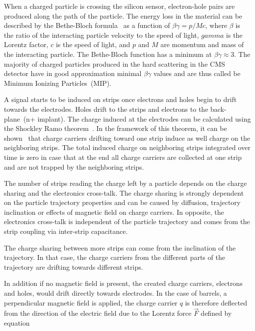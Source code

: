 When a charged particle is crossing the silicon sensor, electron-hole pairs are produced along the path of the particle. The energy loss in the material can be described by the Bethe-Bloch formula~\cite{Groom:2000sm} as a function of $\beta\gamma = p/Mc$, where $\beta$ is the ratio of the interacting particle velocity to the speed of light, $gamma$ is the Lorentz factor, $c$ is the speed of light, and $p$ and $M$ are momentum and mass of the interacting particle. The Bethe-Bloch function has a minimum at $\beta\gamma \approx 3$. The majority of charged particles produced in the hard scattering in the CMS detector have in good approximation minimal $\beta\gamma$ values and are thus called be Minimum Ionizing Particles~(MIP).

A signal starts to be induced on strips once electrons and holes begin to drift towards the electrodes. Holes drift to the strips and electrons to the back-plane~(n+ implant). The charge induced at the electrodes can be calculated using the Shockley Ramo theorem~\cite{doi:10.1063/1.1710367,Ramo:1939vr}. In the framework of this theorem, it can be shown~\cite{Bloch:2007zza} that charge carriers drifting toward one strip induce as well charge on the neighboring strips. The total induced charge on neighboring strips integrated over time is zero in case that at the end all charge carriers are collected at one strip and are not trapped by the neighboring strips.

The number of strips reading the charge left by a particle depends on the charge sharing and the electronics cross-talk. The charge sharing is strongly dependent on the particle trajectory properties and can be caused by diffusion, trajectory inclination or effects of magnetic field on charge carriers. In opposite, the electronics cross-talk is independent of the particle trajectory and comes from the strip coupling via inter-strip capacitance.  

The charge sharing between more strips can come from the inclination of the trajectory. In that case, the charge carriers from the different parts of the trajectory are drifting towards different strips.

In addition if no magnetic field is present, the created charge carriers, electrons and holes, would drift directly towards electrodes. In the case of barrels, a perpendicular magnetic field is applied, the charge carrier $q$ is therefore deflected from the direction of the electric field due to the Lorentz force $\vec{F}$ defined by equation

